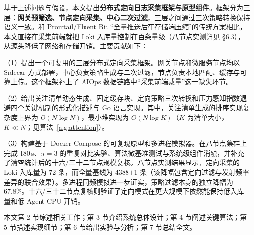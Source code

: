 基于上述问题与假设，本文提出\textbf{分布式定向日志采集框架与原型组件}。框架分为三层：\textbf{网关预筛选、节点定向采集、中心二次过滤}，三层之间通过三次策略转换保持语义一致。和 Promtail/Fluent Bit ``全量推送后在存储端压缩''的传统方案相比，本文直接在采集前端就把 Loki 入库量控制在百条量级（八节点实测详见 §6.3），从源头降低了网络和存储开销。主要贡献如下：

（1）提出一个可复用的三层分布式定向采集框架。网关节点和微服务节点均以 Sidecar 方式部署，中心负责策略生成与二次过滤，节点负责本地匹配、缓存与可靠上传。这个框架补上了 AIOps 数据链路中``采集前端减量''这一缺失环节。

（2）给出关注清单动态生成、固定缓存块、定向策略三次转换和压力感知指数退避四个关键机制的形式化描述与 Go 语言实现。其中，关注清单生成的排序实现复杂度上界为 $O(N\log N)$，最小堆实现为 $O(N\log K)$（$K$ 为清单大小，$K \ll N$；见算法~\ref{alg:attention}）。

（3）构建基于 Docker Compose 的可复现原型和多进程模拟器。在八节点集群上完成 180\,s、$n{=}3$ 的重复对比实验、算法微基准测试与系统级组件消融，并补充了清空统计后的十六/三十二节点规模复核。八节点实测结果显示，定向采集的 Loki 入库量为 72 条，而全量基线为 4388$\pm$1 条（该降幅包含定向过滤与发射频率差异的联合效果）。多进程同频模拟进一步证实，策略过滤本身的独立降幅为 67.8\%。十六/三十二节点复核则验证了定向模式在更大规模下依然能保持低入库量和低 Agent CPU 开销。

本文第 2 节综述相关工作；第 3 节介绍系统总体设计；第 4 节阐述关键算法；第 5 节描述实现细节；第 6 节给出实验与分析；第 7 节总结全文。
